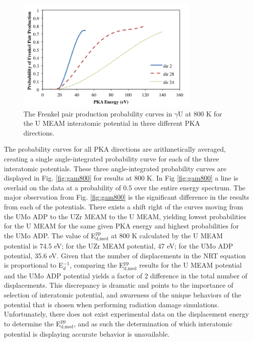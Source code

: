 \documentclass[review]{elsarticle}
\begin{document}
\begin{figure}[h]
 \centering
 \includegraphics[width=0.8\textwidth]{ed_dir.png} %
 \caption{The Frenkel pair production probability curves in $\gamma$U at 800 K for the U MEAM interatomic potential in three different PKA directions.}
 \label{fig:ed_dir}
\end{figure}

\FloatBarrier

The probability curves for all PKA directions are arithmetically averaged, creating a single angle-integrated probability curve for each of the three interatomic potentials. These three angle-integrated probability curves are displayed in Fig. \ref{fig:gam800} for results at 800 K. In Fig \ref{fig:gam800} a line is overlaid on the data at a probability of 0.5 over the entire energy spectrum. The major observation from Fig. \ref{fig:gam800} is the significant difference in the results from each of the potentials. There exists a shift right of the curves moving from the UMo ADP to the UZr MEAM to the U MEAM, yielding lowest probabilities for the U MEAM for the same given PKA energy and highest probabilities for the UMo ADP. The value of E$^{\textrm{pp}}_{\textrm{d,med}}$ at 800 K calculated by the U MEAM potential is 74.5 eV; for the UZr MEAM potential, 47 eV; for the UMo ADP potential, 35.6 eV. Given that the number of displacements in the NRT equation \cite{norgett1975} is proportional to E$_{d}^{-1}$, comparing the E$^{\textrm{pp}}_{\textrm{d,med}}$ results for the U MEAM potential and the UMo ADP potential yields a factor of 2 difference in the total number of displacements. This discrepancy is dramatic and points to the importance of selection of interatomic potential, and awareness of the unique behaviors of the potential that is chosen when performing radiation damage simulations. Unfortunately, there does not exist experimental data on the displacement energy to determine the E$^{\textrm{pp}}_{\textrm{d,med}}$, and as such the determination of which interatomic potential is displaying accurate behavior is unavailable. 
\end{document}
